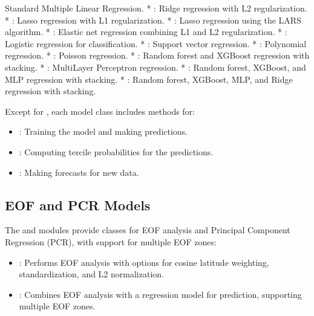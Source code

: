 \documentclass[letterpaper,10pt,english]{sphinxmanual}
\begin{document}
\sphinxAtStartPar
Standard Multiple Linear Regression.
* : Ridge regression with L2 regularization.
* : Lasso regression with L1 regularization.
* : Lasso regression using the LARS algorithm.
* : Elastic net regression combining L1 and L2 regularization.
* : Logistic regression for classification.
* : Support vector regression.
* : Polynomial regression.
* : Poisson regression.
* : Random forest and XGBoost regression with stacking.
* : Multi\sphinxhyphen{}Layer Perceptron regression.
* : Random forest, XGBoost, and MLP regression with stacking.
* : Random forest, XGBoost, MLP, and Ridge regression with stacking.

\sphinxAtStartPar
Except for , each model class includes methods for:
\begin{itemize}
\item {} 
\sphinxAtStartPar
{}: Training the model and making predictions.

\item {} 
\sphinxAtStartPar
{}: Computing tercile probabilities for the predictions.

\item {} 
\sphinxAtStartPar
{}: Making forecasts for new data.

\end{itemize}


\subsection{EOF and PCR Models}
\label{\detokenize{Models:eof-and-pcr-models}}
\sphinxAtStartPar
The  and  modules provide classes for EOF analysis and Principal Component Regression (PCR), with support for multiple EOF zones:
\begin{itemize}
\item {} 
\sphinxAtStartPar
{}: Performs EOF analysis with options for cosine latitude weighting, standardization, and L2 normalization.

\item {} 
\sphinxAtStartPar
{}: Combines EOF analysis with a regression model for prediction, supporting multiple EOF zones.

\end{itemize}
\end{document}
